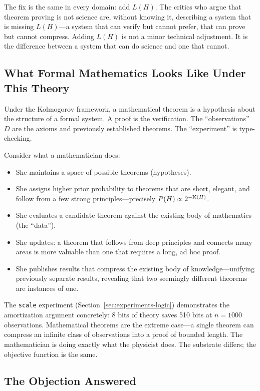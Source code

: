 The fix is the same in every domain: add $L(H)$. The critics who
argue that theorem proving is not science are, without knowing it,
describing a system that is missing $L(H)$---a system that can verify
but cannot prefer, that can prove but cannot compress. Adding $L(H)$
is not a minor technical adjustment. It is the difference between a
system that can do science and one that cannot.

\subsection{What Formal Mathematics Looks Like Under This Theory}

Under the Kolmogorov framework, a mathematical theorem is a hypothesis
about the structure of a formal system. A proof is the verification.
The ``observations'' $D$ are the axioms and previously established
theorems. The ``experiment'' is type-checking.

Consider what a mathematician does:
\begin{itemize}
  \item She maintains a space of possible theorems (hypotheses).
  \item She assigns higher prior probability to theorems that are
        short, elegant, and follow from a few strong
        principles---precisely $P(H) \propto 2^{-\mathrm{K}(H)}$.
  \item She evaluates a candidate theorem against the existing body of
        mathematics (the ``data'').
  \item She updates: a theorem that follows from deep principles and
        connects many areas is more valuable than one that requires a
        long, ad hoc proof.
  \item She publishes results that compress the existing body of
        knowledge---unifying previously separate results, revealing
        that two seemingly different theorems are instances of one.
\end{itemize}
The \texttt{scale} experiment (Section~\ref{sec:experiments-logic})
demonstrates the amortization argument concretely: 8 bits of theory
saves 510 bits at $n = 1000$ observations. Mathematical theorems are
the extreme case---a single theorem can compress an infinite class of
observations into a proof of bounded length. The mathematician is
doing exactly what the physicist does. The substrate differs; the
objective function is the same.

\subsection{The Objection Answered}

